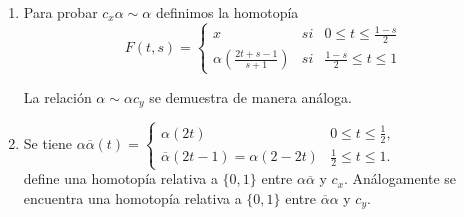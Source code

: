 \documentclass[bibtex, anon]{TEMat-article}
\begin{document}
\begin{demostracion}
\begin{enumerate}
		\item Para probar $c_x\alpha\sim\alpha$ definimos la homotopía
		\[
		F(t,s)=\left\{\begin{array}{lcc}
		x & si & 0\leq t\leq\frac{1-s}{2}\\
		\alpha\left(\frac{2t+s-1}{s+1}\right) & si & \frac{1-s}{2}\leq t\leq 1
		\end{array}\right.
		\]
		
		La relación $\alpha\sim\alpha c_y$ se demuestra de manera análoga.
		
		\item Se tiene $\alpha\overline{\alpha}(t)=\left\{\begin{array}{lc}
		\alpha(2t) & 0\leq t\leq\frac{1}{2},\\
		\overline{\alpha}(2t-1)=\alpha(2-2t) & \frac{1}{2}\leq t\leq 1.
		\end{array}\right.$\\
		
%		
%		
		
		
		define una homotopía relativa a $\{0,1\}$ entre $\alpha\overline{\alpha}$ y $c_x$. Análogamente se encuentra una homotopía relativa a $\{0,1\}$ entre $\overline{\alpha}\alpha$ y $c_y$.
	\end{enumerate}
\end{demostracion}
\end{document}
